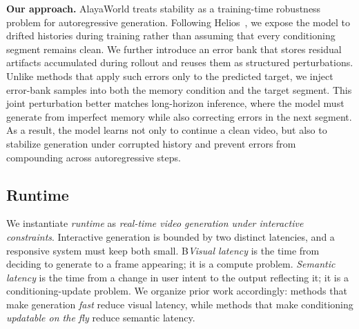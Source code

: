 \textbf{Our approach.}
AlayaWorld treats stability as a training-time robustness problem for autoregressive generation.
Following Helios~\cite{yuan2026helios}, we expose the model to drifted histories during training rather than assuming that every conditioning segment remains clean.
We further introduce an error bank that stores residual artifacts accumulated during rollout and reuses them as structured perturbations.
Unlike methods that apply such errors only to the predicted target, we inject error-bank samples into both the memory condition and the target segment.
This joint perturbation better matches long-horizon inference, where the model must generate from imperfect memory while also correcting errors in the next segment.
As a result, the model learns not only to continue a clean video, but also to stabilize generation under corrupted history and prevent errors from compounding across autoregressive steps.

\subsection{Runtime}
\label{subsec:responsiveness}

We instantiate \textit{runtime} as \textit{real-time video generation under interactive constraints}.
Interactive generation is bounded by two distinct latencies, and a responsive system must keep both small.
B\emph{Visual latency} is the time from deciding to generate to a frame appearing; it is a compute problem.
\emph{Semantic latency} is the time from a change in user intent to the output reflecting it; it is a conditioning-update problem.
We organize prior work accordingly: methods that make generation \emph{fast} reduce visual latency, while methods that make conditioning \emph{updatable on the fly} reduce semantic latency.


